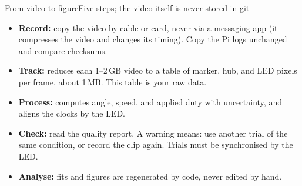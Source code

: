 %
\begin{frame}{From video to figure}{Five steps; the video itself is never stored in git}
  \label{app:pipeline}
  \footnotesize
  \centering

  \vspace{6pt}
  \raggedright
  \begin{itemize}\setlength{\itemsep}{2pt}
    \item \textbf{Record:} copy the video by cable or card, never via a messaging app (it compresses the video and changes its timing). Copy the Pi logs unchanged and compare checksums.
    \item \textbf{Track:} reduces each 1--2\,GB video to a table of marker, hub, and LED pixels per frame, about 1\,MB. This table is your \alert{raw data}.
    \item \textbf{Process:} computes angle, speed, and applied duty with uncertainty, and aligns the clocks by the LED.
    \item \textbf{Check:} read the quality report. A warning means: use another trial of the same condition, or record the clip again. Trials must be synchronised by the LED.
    \item \textbf{Analyse:} fits and figures are \alert{regenerated by code}, never edited by hand.
  \end{itemize}
\end{frame}
